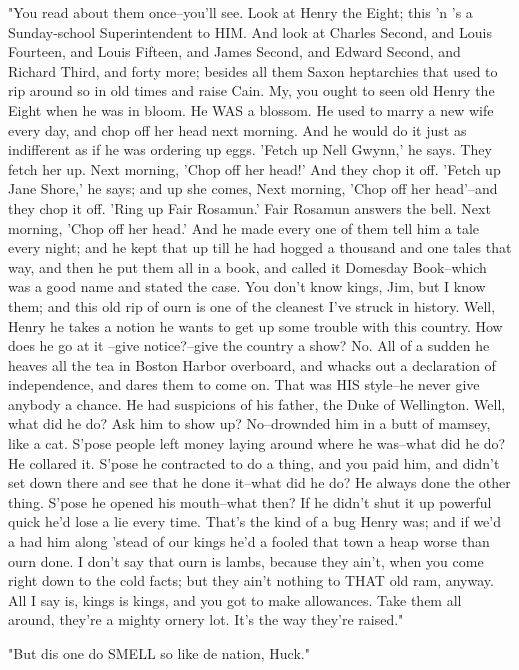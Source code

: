 "You read about them once--you'll see.  Look at Henry the Eight; this 'n
's a Sunday-school Superintendent to HIM.  And look at Charles Second,
and Louis Fourteen, and Louis Fifteen, and James Second, and Edward
Second, and Richard Third, and forty more; besides all them Saxon
heptarchies that used to rip around so in old times and raise Cain.  My,
you ought to seen old Henry the Eight when he was in bloom.  He WAS a
blossom.  He used to marry a new wife every day, and chop off her head
next morning.  And he would do it just as indifferent as if he was
ordering up eggs.  'Fetch up Nell Gwynn,' he says.  They fetch her up.
Next morning, 'Chop off her head!'  And they chop it off.  'Fetch up Jane
Shore,' he says; and up she comes, Next morning, 'Chop off her head'--and
they chop it off.  'Ring up Fair Rosamun.'  Fair Rosamun answers the
bell.  Next morning, 'Chop off her head.'  And he made every one of them
tell him a tale every night; and he kept that up till he had hogged a
thousand and one tales that way, and then he put them all in a book, and
called it Domesday Book--which was a good name and stated the case.  You
don't know kings, Jim, but I know them; and this old rip of ourn is one
of the cleanest I've struck in history.  Well, Henry he takes a notion he
wants to get up some trouble with this country. How does he go at it
--give notice?--give the country a show?  No.  All of a sudden he heaves
all the tea in Boston Harbor overboard, and whacks out a declaration of
independence, and dares them to come on.  That was HIS style--he never
give anybody a chance.  He had suspicions of his father, the Duke of
Wellington.  Well, what did he do?  Ask him to show up?  No--drownded
him in a butt of mamsey, like a cat.  S'pose people left money laying
around where he was--what did he do?  He collared it.  S'pose he
contracted to do a thing, and you paid him, and didn't set down there and
see that he done it--what did he do?  He always done the other thing.
S'pose he opened his mouth--what then?  If he didn't shut it up powerful
quick he'd lose a lie every time.  That's the kind of a bug Henry was;
and if we'd a had him along 'stead of our kings he'd a fooled that town a
heap worse than ourn done.  I don't say that ourn is lambs, because they
ain't, when you come right down to the cold facts; but they ain't nothing
to THAT old ram, anyway.  All I say is, kings is kings, and you got to
make allowances.  Take them all around, they're a mighty ornery lot.
It's the way they're raised."

"But dis one do SMELL so like de nation, Huck."

